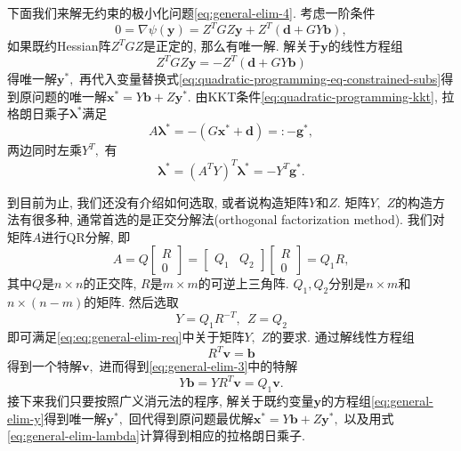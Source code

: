 \documentclass{SBCbookchapter}
\newcommand{\V}[1]{{\bm{#1}}}
\numberwithin{equation}{section}
\begin{document}
下面我们来解无约束的极小化问题\eqref{eq:general-elim-4}. 考虑一阶条件
\begin{equation}
\label{eq:general-elim-5}
0 = \nabla \psi (\V{y}) = Z^T G Z \V{y} + Z^T \left( \V{d} + G Y \V{b} \right),
\end{equation}
如果既约Hessian阵$Z^T G Z$是正定的, 那么有唯一解. 解关于$\V{y}$的线性方程组
\begin{equation}
\label{eq:general-elim-y}
Z^T G Z \V{y} = - Z^T \left( \V{d} + G Y \V{b} \right)
\end{equation}
得唯一解$\V{y}^*,$ 再代入变量替换式\eqref{eq:quadratic-programming-eq-constrained-subs}得到原问题的唯一解$\V{x}^* = Y \V{b} + Z \V{y}^*.$ 由KKT条件\eqref{eq:quadratic-programming-kkt}, 拉格朗日乘子$\V{\lambda}^*$满足
\begin{equation}
\label{eq:general-elim-lagrange}
A \V{\lambda}^* = -\left( G \V{x}^* + \V{d} \right) =: - \V{g}^*,
\end{equation}
两边同时左乘$Y^T,$ 有
\begin{equation}
\label{eq:general-elim-lambda}
\V{\lambda}^* = \left( A^T Y \right)^T \V{\lambda}^* = -Y^T \V{g}^*.
\end{equation}

到目前为止, 我们还没有介绍如何选取, 或者说构造矩阵$Y$和$Z.$ 矩阵$Y,$ $Z$的构造方法有很多种, 通常首选的是正交分解法(orthogonal factorization method). 我们对矩阵$A$进行QR分解, 即
\begin{equation}
\label{eq:quadratic-programming-qr-decomp-1}
A = Q \begin{bmatrix} R \\ 0 \end{bmatrix} = \begin{bmatrix} Q_1 & Q_2 \end{bmatrix} \begin{bmatrix} R \\ 0 \end{bmatrix} = Q_1 R,
\end{equation}
其中$Q$是$n \times n$的正交阵, $R$是$m \times m$的可逆上三角阵. $Q_1, Q_2$分别是$n \times m$和$n \times (n - m)$的矩阵. 然后选取
\begin{equation}
\label{eq:quadratic-programming-qr-decomp-2}
Y = Q_1 R^{-T}, ~~ Z = Q_2
\end{equation}
即可满足\eqref{eq:eq:general-elim-req}中关于矩阵$Y,$ $Z$的要求. 通过解线性方程组
\begin{equation*}
R^T \V{v} = \V{b}
\end{equation*}
得到一个特解$\V{v},$ 进而得到\eqref{eq:general-elim-3}中的特解
\begin{equation*}
Y \V{b} = Y R^T \V{v} = Q_1 \V{v}.
\end{equation*}
接下来我们只要按照广义消元法的程序, 解关于既约变量$\V{y}$的方程组\eqref{eq:general-elim-y}得到唯一解$\V{y}^*,$ 回代得到原问题最优解$\V{x}^* = Y \V{b} + Z \V{y}^*,$ 以及用式\eqref{eq:general-elim-lambda}计算得到相应的拉格朗日乘子.
\end{document}
